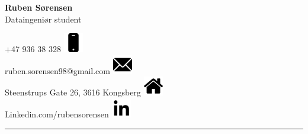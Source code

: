\documentclass[a4paper, 12pt]{article}
\newcommand{\horizontalline}[1]{\vspace{5mm}\noindent\rule{#1}{0.04pt}\vspace{5mm}}
\begin{document}
{\sffamily

    \noindent \begin{minipage}{.5\textwidth}
        \Huge\noindent \textbf{Ruben Sørensen} \\
        \Large Dataingeniør student \\
    \end{minipage}
    \begin{minipage}{.5\textwidth}
        \raggedleft +47 936 38 328                       \includegraphics[scale=0.0225]{res/icon_phone.png}    \\
        \raggedleft ruben.sorensen98@gmail.com           \includegraphics[scale=0.025]{res/icon_envelope.png}  \\
        \raggedleft Steenstrups Gate 26, 3616 Kongsberg  \includegraphics[scale=0.025]{res/icon_house.png}     \\
        \raggedleft Linkedin.com/rubensorensen           \includegraphics[scale=0.025]{res/icon_linkedin}      \\
    \end{minipage}

    \horizontalline{\linewidth}

}
\end{document}
